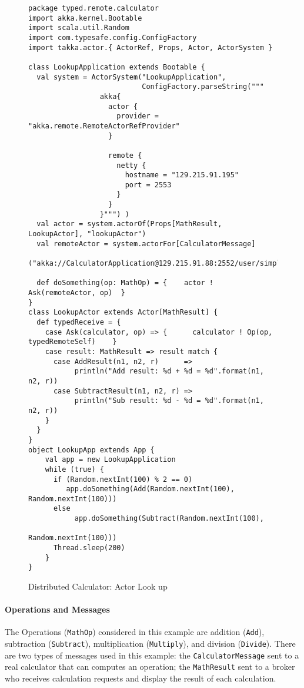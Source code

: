 \begin{figure}[p]
\begin{lstlisting}
package typed.remote.calculator
import akka.kernel.Bootable
import scala.util.Random
import com.typesafe.config.ConfigFactory
import takka.actor.{ ActorRef, Props, Actor, ActorSystem }

class LookupApplication extends Bootable {
  val system = ActorSystem("LookupApplication", 
                           ConfigFactory.parseString(""" 
                 akka{
                   actor {
                     provider = "akka.remote.RemoteActorRefProvider"
                   }

                   remote {
                     netty {
                       hostname = "129.215.91.195"
                       port = 2553               
                     }
                   }
                 }""") )
  val actor = system.actorOf(Props[MathResult, LookupActor], "lookupActor")
  val remoteActor = system.actorFor[CalculatorMessage]
       ("akka://CalculatorApplication@129.215.91.88:2552/user/simpleCalculator")

  def doSomething(op: MathOp) = {    actor ! Ask(remoteActor, op)  }
}
class LookupActor extends Actor[MathResult] {
  def typedReceive = {
    case Ask(calculator, op) => {      calculator ! Op(op, typedRemoteSelf)    }
    case result: MathResult => result match {
      case AddResult(n1, n2, r)      => 
           println("Add result: %d + %d = %d".format(n1, n2, r))
      case SubtractResult(n1, n2, r) => 
           println("Sub result: %d - %d = %d".format(n1, n2, r))
    }
  }
}
object LookupApp extends App {
    val app = new LookupApplication
    while (true) {
      if (Random.nextInt(100) % 2 == 0) 
         app.doSomething(Add(Random.nextInt(100), Random.nextInt(100)))
      else 
           app.doSomething(Subtract(Random.nextInt(100), 
                                        Random.nextInt(100)))
      Thread.sleep(200)
    }
}
\end{lstlisting}
\caption{Distributed Calculator: Actor Look up}
\label{discal_lookup}
\end{figure}

\paragraph{Operations and Messages} The Operations ({\tt MathOp}) considered in 
this example are addition ({\tt Add}), subtraction ({\tt Subtract}), 
multiplication ({\tt Multiply}), and division ({\tt Divide}).  There are two 
types of messages used in this example: the {\tt CalculatorMessage} sent to a 
real calculator that can computes an operation; the {\tt MathResult} sent to a 
broker who receives calculation requests and display the result of each 
calculation.


